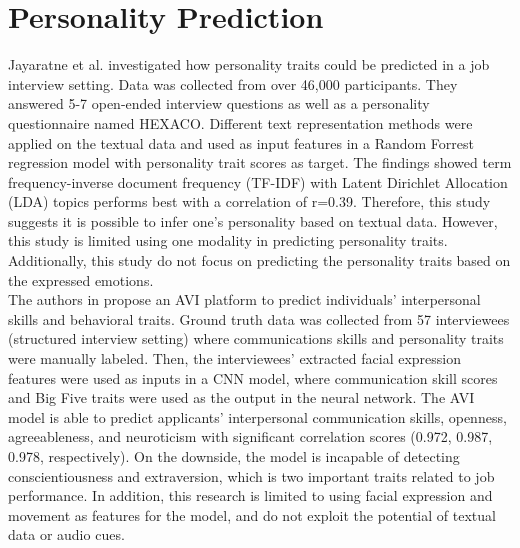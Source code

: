\section{Personality Prediction}
\label{sec:personality_prediction}
Jayaratne et al. \cite{personality-prediction-questions-9121971} investigated how personality traits could be predicted in a job interview setting. Data was collected from over 46,000 participants. They answered 5-7 open-ended interview questions as well as a personality questionnaire named HEXACO. Different text representation methods were applied on the textual data and used as input features in a Random Forrest regression model with personality trait scores as target. The findings showed term frequency-inverse document frequency (TF-IDF) with Latent Dirichlet Allocation (LDA) topics performs best with a correlation of r=0.39. Therefore, this study suggests it is possible to infer one's personality based on textual data. However, this study is limited using one modality in predicting personality traits. Additionally, this study do not focus on predicting the personality traits based on the expressed emotions.  \\ 

The authors in \cite{video-interview3-suen2020intelligent} propose an AVI platform to predict individuals' interpersonal skills and behavioral traits. Ground truth data was collected from 57 interviewees (structured interview setting) where communications skills and personality traits were manually labeled. Then, the interviewees’ extracted facial expression features were used as inputs in a CNN model, where communication skill scores and Big Five traits were used as the output in the neural network. The AVI model is able to predict applicants' interpersonal communication skills, openness, agreeableness, and neuroticism with significant correlation scores (0.972, 0.987, 0.978, respectively). On the downside, the model is incapable of detecting conscientiousness and extraversion, which is two important traits related to job performance. In addition, this research is limited to using facial expression and movement as features for the model, and do not exploit the potential of textual data or audio cues. \\

